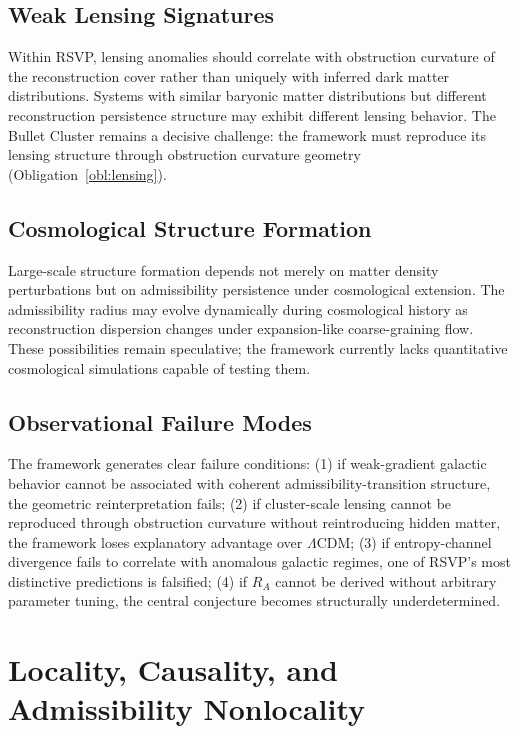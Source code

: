 \documentclass[11pt, a4paper]{article}
\theoremstyle{plain}
\theoremstyle{definition}
\theoremstyle{remark}
\newcommand{\RA}{R_{\!A}}
\begin{document}
\subsection{Weak Lensing Signatures}

Within RSVP, lensing anomalies should correlate with obstruction curvature of the
reconstruction cover rather than uniquely with inferred dark matter distributions.
Systems with similar baryonic matter distributions but different reconstruction
persistence structure may exhibit different lensing behavior. The Bullet Cluster
remains a decisive challenge: the framework must reproduce its lensing structure
through obstruction curvature geometry (Obligation~\ref{obl:lensing}).

\subsection{Cosmological Structure Formation}

Large-scale structure formation depends not merely on matter density perturbations
but on admissibility persistence under cosmological extension. The admissibility
radius may evolve dynamically during cosmological history as reconstruction dispersion
changes under expansion-like coarse-graining flow. These possibilities remain
speculative; the framework currently lacks quantitative cosmological simulations
capable of testing them.

\subsection{Observational Failure Modes}

The framework generates clear failure conditions: (1) if weak-gradient galactic
behavior cannot be associated with coherent admissibility-transition structure, the
geometric reinterpretation fails; (2) if cluster-scale lensing cannot be reproduced
through obstruction curvature without reintroducing hidden matter, the framework
loses explanatory advantage over $\Lambda$CDM; (3) if entropy-channel divergence
fails to correlate with anomalous galactic regimes, one of RSVP's most distinctive
predictions is falsified; (4) if $\RA$ cannot be derived without arbitrary parameter
tuning, the central conjecture becomes structurally underdetermined.

\section{Locality, Causality, and Admissibility Nonlocality}
\label{app:locality}
\end{document}
